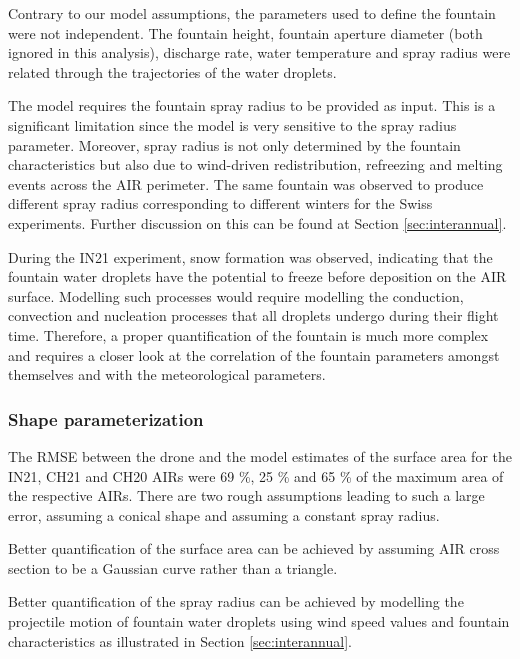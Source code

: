 Contrary to our model assumptions, the parameters used to define the fountain were not independent. The fountain
height, fountain aperture diameter (both ignored in this analysis), discharge rate, water temperature and spray
radius were related through the trajectories of the water droplets.

The model requires the fountain spray radius to be provided as input. This is a significant limitation since the
model is very sensitive to the spray radius parameter. Moreover, spray radius is not only determined by the fountain
characteristics but also due to wind-driven redistribution, refreezing and melting events across the AIR
perimeter. The same fountain was observed to produce different spray radius corresponding to different winters
for the Swiss experiments. Further discussion on this can be found at Section \ref{sec:interannual}.


During the IN21 experiment, snow formation was observed, indicating that the fountain water droplets have the
potential to freeze before deposition on the AIR surface. Modelling such processes would require modelling the
conduction, convection and nucleation processes that all droplets undergo during their flight time. Therefore, a
proper quantification of the fountain is much more complex and requires a closer look at the correlation of the
fountain parameters amongst themselves and with the meteorological parameters.

\subsubsection{Shape parameterization}

The \ac{RMSE} between the drone and the model estimates of the surface area for the IN21, CH21 and CH20 \ac{AIRs}
were 69 \%, 25 \% and 65 \% of the maximum area of the respective \ac{AIRs}. There are two rough assumptions
leading to such a large error, assuming a conical shape and assuming a constant spray radius.

Better quantification of the surface area can be achieved by assuming AIR cross section to be a Gaussian curve
rather than a triangle.

Better quantification of the spray radius can be achieved by modelling the projectile motion of fountain water
droplets using wind speed values and fountain characteristics as illustrated in Section \ref{sec:interannual}.


